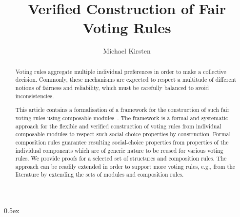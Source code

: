 \documentclass[11pt,a4paper,notitlepage]{report}
\begin{document}
\title{Verified Construction of Fair Voting Rules}
\author{Michael Kirsten}
\maketitle

\begin{abstract}
Voting rules aggregate multiple individual preferences in order to make a
collective decision.
Commonly, these mechanisms are expected to respect a multitude of different
notions of fairness and reliability, which must be carefully balanced to avoid
inconsistencies.

This article contains a formalisation of a framework for the construction of
such fair voting rules using composable modules~\cite{adt2019,lopstr2019}.
The framework is a formal and systematic approach for the flexible and verified
construction of voting rules from individual composable modules to respect such
social-choice properties by construction.
Formal composition rules guarantee resulting social-choice properties from
properties of the individual components which are of generic nature to be
reused for various voting rules.
We provide proofs for a selected set of structures and composition rules.
The approach can be readily extended in order to support more voting rules,
e.g., from the literature by extending the sets of modules and composition
rules.
\end{abstract}

\tableofcontents

\parindent 0pt\parskip 0.5ex





\end{document}

